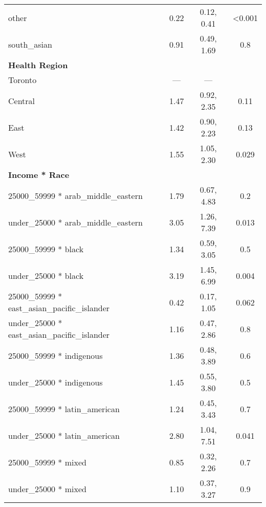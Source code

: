 \documentclass[
  letterpaper,
  DIV=11,
  numbers=noendperiod]{scrartcl}
\begin{document}
\begin{longtable}{lccc}
\hspace{1em}other & 0.22 & 0.12, 0.41 & <0.001\\
\hspace{1em}south\_asian & 0.91 & 0.49, 1.69 & 0.8\\
\textbf{Health Region} &  &  & \\
\hspace{1em}Toronto & — & — & \\
\hspace{1em}Central & 1.47 & 0.92, 2.35 & 0.11\\
\hspace{1em}East & 1.42 & 0.90, 2.23 & 0.13\\
\hspace{1em}West & 1.55 & 1.05, 2.30 & 0.029\\
\textbf{Income * Race} &  &  & \\
\hspace{1em}25000\_59999 * arab\_middle\_eastern & 1.79 & 0.67, 4.83 & 0.2\\
\hspace{1em}under\_25000 * arab\_middle\_eastern & 3.05 & 1.26, 7.39 & 0.013\\
\hspace{1em}25000\_59999 * black & 1.34 & 0.59, 3.05 & 0.5\\
\hspace{1em}under\_25000 * black & 3.19 & 1.45, 6.99 & 0.004\\
\hspace{1em}25000\_59999 * east\_asian\_pacific\_islander & 0.42 & 0.17, 1.05 & 0.062\\
\hspace{1em}under\_25000 * east\_asian\_pacific\_islander & 1.16 & 0.47, 2.86 & 0.8\\
\hspace{1em}25000\_59999 * indigenous & 1.36 & 0.48, 3.89 & 0.6\\
\hspace{1em}under\_25000 * indigenous & 1.45 & 0.55, 3.80 & 0.5\\
\hspace{1em}25000\_59999 * latin\_american & 1.24 & 0.45, 3.43 & 0.7\\
\hspace{1em}under\_25000 * latin\_american & 2.80 & 1.04, 7.51 & 0.041\\
\hspace{1em}25000\_59999 * mixed & 0.85 & 0.32, 2.26 & 0.7\\
\hspace{1em}under\_25000 * mixed & 1.10 & 0.37, 3.27 & 0.9\\

\end{longtable}
\end{document}
